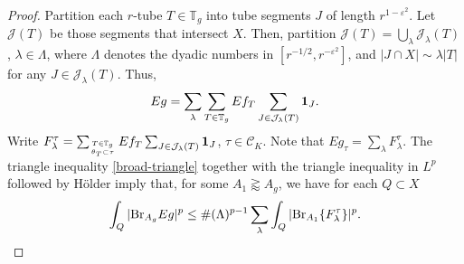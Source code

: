 \documentclass{amsart}%
\numberwithin{equation}{section}
\newcommand{\e}{\varepsilon}
\newcommand{\la}{\lambda}
\newcommand{\cj}{\mathcal J}
\newcommand{\ZT}{\mathbb{T}}
\newcommand{\Id}{{\bf{1}}}
\newcommand{\cC}{{\mathcal C}}
\newcommand{\Br}{{\rm{Br}}}
\newcommand{\1}{\mathbbm{1}}
\begin{document}
\begin{proof}
	
	
	\medskip
	
	
	Partition each $r$-tube $T\in\ZT_g$ into  tube segments $J$ of length $r^{1-\e^2}$. Let $\cj(T)$ be those segments that intersect $X$. 
	Then, partition  $\cj(T)=\bigcup_\la\cj_\la(T)$, $\la\in\Lambda$, where $\Lambda$ denotes the dyadic numbers in $[r^{-1/2},r^{-\e^2}]$, and $|J\cap X|\sim \la |T|$ for any $J\in\cj_\la(T)$. 
	Thus, 
	\begin{equation}
		\nonumber
		Eg=\sum_{\la}\sum_{T\in\ZT_g}Ef_{T}\sum_{J\in\cj_\la(T)}\Id_J.    
	\end{equation}
    Write $F_\lambda^\tau=\sum_{T\in\ZT_g\atop{\theta_T\subset\tau}}Ef_{T}\sum_{J\in\cj_\la(T)}\Id_J$, $\tau\in\cC_K$. Note that $Eg_\tau=\sum_{\lambda}F_\lambda^{\tau}$. The triangle  inequality \eqref{broad-triangle} together with the triangle inequality in $L^p$ followed by H\"older imply that, for some $A_1\gtrapprox A_g$, we have for each $Q\subset X$
    $$\int_{Q}|\Br_{A_g} Eg|^p\le \#(\Lambda)^{p-1}\sum_{\lambda}\int_{Q}|\Br_{A_1} \{F_\lambda^{\tau}\}|^p.$$


\end{proof}
\end{document}
